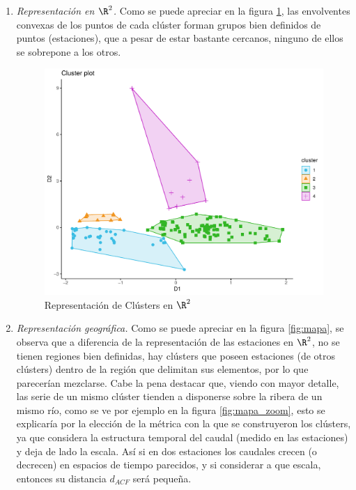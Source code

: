 \documentclass[12pt,oneside]{book}\usepackage[]{graphicx}\usepackage[]{color}
\theoremstyle{definition} %
\begin{document}
\begin{enumerate}

\item \textit{Representación en $\R^2$.} Como se puede apreciar en la figura \ref{fig:puntosR2}, las envolventes convexas de los puntos de cada clúster forman grupos bien definidos de puntos (estaciones), que a pesar de estar bastante cercanos, ninguno de ellos se sobrepone a los otros.

\begin{figure}[H]
\centering
\includegraphics[scale=0.65]{Resultados/2_plot_cluster_dimensiones}
\caption{Representación de Clústers en $\R^2$ }\label{fig:puntosR2}
\end{figure}




\item \textit{Representación geográfica.} Como se puede apreciar en la figura \ref{fig:mapa}, se observa que a diferencia de la representación de las estaciones en $\R^2$, no se tienen regiones bien definidas, hay clústers que poseen estaciones (de otros clústers) dentro de la región que delimitan sus elementos, por lo que parecerían mezclarse. Cabe la pena destacar que, viendo con mayor detalle, las serie de un mismo clúster tienden a disponerse sobre la ribera de un mismo río, como se ve por ejemplo en la figura \ref{fig:mapa_zoom}, esto se explicaría por la elección de la métrica con la que se construyeron los clústers, ya que considera la estructura temporal del caudal (medido en las estaciones) y deja de lado la escala. Así si en dos estaciones los caudales crecen (o decrecen) en espacios de tiempo parecidos, y si considerar a que escala, entonces su distancia $d_{ACF}$ será pequeña.



\end{enumerate}
\end{document}
